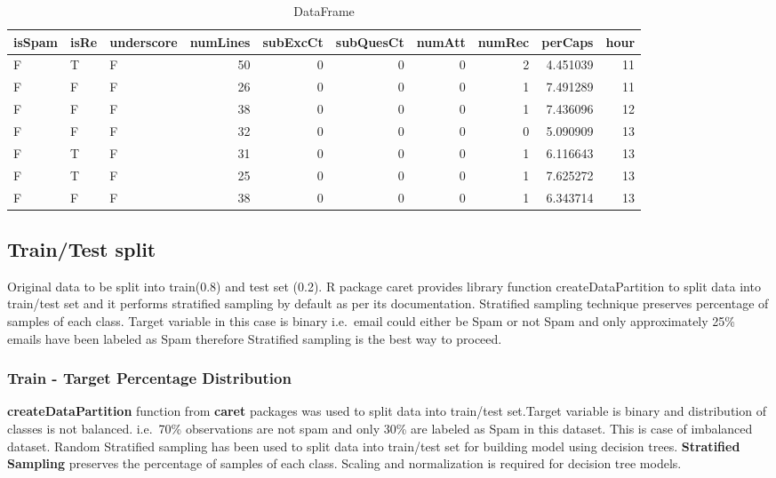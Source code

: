 \documentclass[
]{article}
\begin{document}
\begin{table}[!b]

\caption{\label{tab:unnamed-chunk-16}DataFrame}
\centering
\begin{tabular}[t]{l|l|l|r|r|r|r|r|r|r}
\hline
isSpam & isRe & underscore & numLines & subExcCt & subQuesCt & numAtt & numRec & perCaps & hour\\
\hline
F & T & F & 50 & 0 & 0 & 0 & 2 & 4.451039 & 11\\
\hline
F & F & F & 26 & 0 & 0 & 0 & 1 & 7.491289 & 11\\
\hline
F & F & F & 38 & 0 & 0 & 0 & 1 & 7.436096 & 12\\
\hline
F & F & F & 32 & 0 & 0 & 0 & 0 & 5.090909 & 13\\
\hline
F & T & F & 31 & 0 & 0 & 0 & 1 & 6.116643 & 13\\
\hline
F & T & F & 25 & 0 & 0 & 0 & 1 & 7.625272 & 13\\
\hline
F & F & F & 38 & 0 & 0 & 0 & 1 & 6.343714 & 13\\
\hline
\end{tabular}
\end{table}

\hypertarget{traintest-split}{%
\subsection{Train/Test split}\label{traintest-split}}

Original data to be split into train(0.8) and test set (0.2). R package
caret provides library function createDataPartition to split data into
train/test set and it performs stratified sampling by default as per its
documentation. Stratified sampling technique preserves percentage of
samples of each class. Target variable in this case is binary i.e.~email
could either be Spam or not Spam and only approximately 25\% emails have
been labeled as Spam therefore Stratified sampling is the best way to
proceed.

\hypertarget{train---target-percentage-distribution}{%
\subsubsection{Train - Target Percentage
Distribution}\label{train---target-percentage-distribution}}

\textbf{createDataPartition} function from \textbf{caret} packages was
used to split data into train/test set.Target variable is binary and
distribution of classes is not balanced. i.e.~70\% observations are not
spam and only 30\% are labeled as Spam in this dataset. This is case of
imbalanced dataset. Random Stratified sampling has been used to split
data into train/test set for building model using decision trees.
\textbf{Stratified Sampling} preserves the percentage of samples of each
class. Scaling and normalization is required for decision tree models.
\end{document}
